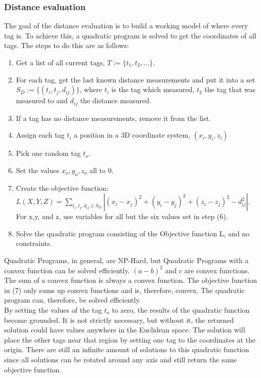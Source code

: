 \subsubsection{Distance evaluation}
\label{ss:distance_eval}
The goal of the distance evaluation is to build a working model of where every tag is.
To achieve this, a quadratic program is solved to get the coordinates of all tags.
The steps to do this are as follows:
\begin{enumerate}
	\item Get a list of all current tags, $T:=\{ t_1, t_2, ... \}$.
	\item For each tag, get the last known distance measurements and put it into a set $S_D:=\{ (t_i, t_j, d_{ij}) \} $, where $t_i$ is the tag which measured, $t_2$ the tag that was measured to and $d_{ij}$ the distance measured.
	\item If a tag has no distance measurements, remove it from the list.
	\item Assign each tag $t_i$ a position in a 3D coordinate system, $(x_i,y_i,z_i)$
	\item Pick one random tag $t_{o}$.
	\item Set the values $x_{o},y_{o},z_{o}$ all to 0.
	\item Create the objective function: $L(X,Y,Z) = \sum\limits_{t_i, t_j, d_{ij} \in S_D}|(x_i-x_j)^2+(y_i-y_j)^2+(z_i-z_j)^2-d_{ij}^2|$. For x,y, and z, use variables for all but the six values set in step (6).
	\item Solve the quadratic program consisting of the Objective function L, and no constraints.
\end{enumerate}
Quadratic Programs, in general, are NP-Hard, but Quadratic Programs with a convex function can be solved efficiently.
$(a-b)^2$ and $c$ are convex functions.
The sum of a convex function is always a convex function.
The objective function in (7) only sums up convex functions and is, therefore, convex.
The quadratic program can, therefore, be solved efficiently.\\
By setting the values of the tag $t_{o}$ to zero, the results of the quadratic function become grounded.
It is not strictly necessary, but without it, the returned solution could have values anywhere in the Euclidean space.
The solution will place the other tags near that region by setting one tag to the coordinates at the origin.
There are still an infinite amount of solutions to this quadratic function since all solutions can be rotated around any axis and still return the same objective function.

